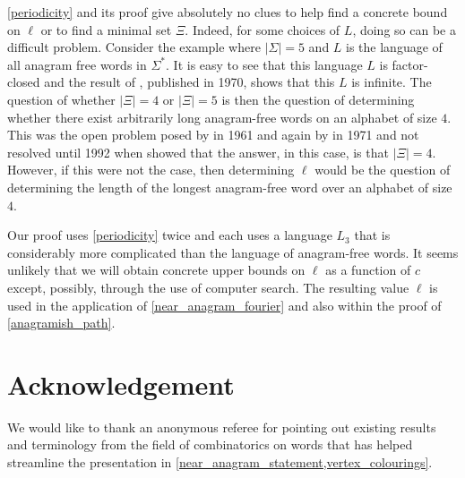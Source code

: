 \documentclass{patmorin}
\begin{document}
\cref{periodicity} and its proof give absolutely no clues to help find a concrete bound on $\ell$ or to find a minimal set $\Xi$. Indeed, for some choices of $L$, doing so can be a difficult problem.  Consider the example where $|\Sigma|=5$ and $L$ is the language of all anagram free words in $\Sigma^*$. It is easy to see that this language $L$ is factor-closed and the result of \citet{pleasants:non-repetitive}, published in 1970, shows that this $L$ is infinite.  The question of whether $|\Xi|=4$ or $|\Xi|=5$ is then the question of determining whether there exist arbitrarily long anagram-free words on an alphabet of size $4$.  This was the open problem posed by \citet{erdos:some} in 1961 and again by \citet{brown:is} in 1971 and not resolved until 1992 when \citet{keranen:abelian,keranen:powerful} showed that the answer, in this case, is that $|\Xi|=4$.  However, if this were not the case, then determining $\ell$ would be the question of determining the length of the longest anagram-free word over an alphabet of size $4$.

Our proof uses \cref{periodicity} twice and each uses a language $L_3$ that is considerably more complicated than the language of anagram-free words. It seems unlikely that we will obtain concrete upper bounds on $\ell$ as a function of $c$ except, possibly, through the use of computer search. The resulting value $\ell$ is used in the application of \cref{near_anagram_fourier} and also within the proof of \cref{anagramish_path}.

\section*{Acknowledgement}

We would like to thank an anonymous referee for pointing out existing results and terminology from the field of combinatorics on words that has helped streamline the presentation in \cref{near_anagram_statement,vertex_colourings}.



\end{document}
